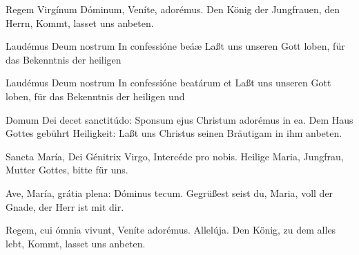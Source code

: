 \documentclass[fontsize=9pt,paper=A6,twoside,BCOR=1mm,DIV=22,headinclude]{scrarticle}
\begin{document}
\begin{paracol}{2}\pcb
	Regem Virgínum Dóminum, \red{*} Veníte, adorémus. \TPA
	\switchcolumn 
	Den König der Jungfrauen, den Herrn, \red{*} Kommt, lasset uns anbeten. \OZA
\end{paracol}

\begin{paracol}{2}\pcb
	Laudémus Deum nostrum \red{*} In confessióne beáæ  \TPA
	\switchcolumn 
	Laßt uns unseren Gott loben, \red{*} für das Bekenntnis der heiligen  \OZA
\end{paracol}
\vfill

\pagebreak
{}
\begin{paracol}{2}\pcb
	Laudémus Deum nostrum \red{*} In confessióne beatárum  et  \TPA
	\switchcolumn 
	Laßt uns unseren Gott loben, \red{*} für das Bekenntnis der heiligen  und  \OZA
\end{paracol}

\begin{paracol}{2}\pcb
	Domum Dei decet sanctitúdo: \red{*} Sponsum ejus Christum adorémus in ea. \TPA
	\switchcolumn 
	Dem Haus Gottes gebührt Heiligkeit: \red{*} Laßt uns Christus seinen Bräutigam in ihm anbeten. \OZA
\end{paracol}

\begin{paracol}{2}\pcb
	Sancta María, Dei Génitrix Virgo, \red{*} Intercéde pro nobis. \TPA
	\switchcolumn 
	Heilige Maria, Jungfrau, Mutter Gottes, \red{*} bitte für uns. \OZA
\end{paracol}

\begin{paracol}{2}\pcb
	Ave, María, grátia plena: \red{*} Dóminus tecum. \TPA
	\switchcolumn 
	Gegrüßest seist du, Maria, voll der Gnade, \red{*} der Herr ist mit dir. \OZA
\end{paracol}

\begin{paracol}{2}\pcb
	Regem, cui ómnia vivunt, \red{*} Veníte adorémus.  Allelúja.\red{)}
	\switchcolumn 
	Den König, zu dem alles lebt, \red{*} Kommt, lasset uns anbeten. \OZA
\end{paracol}
\end{document}
